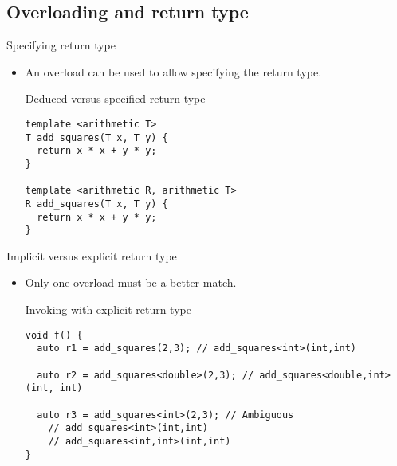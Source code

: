 \subsection{Overloading and return type}

\begin{frame}[t,fragile]{Specifying return type}
\begin{itemize}
  \item An overload can be used to allow specifying the return type.

\begin{block}{Deduced versus specified return type}
\begin{lstlisting}
template <arithmetic T>
T add_squares(T x, T y) {
  return x * x + y * y;
}

template <arithmetic R, arithmetic T>
R add_squares(T x, T y) {
  return x * x + y * y;
}
\end{lstlisting}
\end{block}

\end{itemize}
\end{frame}


\begin{frame}[t,fragile]{Implicit versus explicit return type}
\begin{itemize}

  \item Only one overload must be a better match.

\begin{block}{Invoking with explicit return type}
\begin{lstlisting}
void f() {
  auto r1 = add_squares(2,3); // add_squares<int>(int,int)

  auto r2 = add_squares<double>(2,3); // add_squares<double,int>(int, int)

  auto r3 = add_squares<int>(2,3); // Ambiguous
    // add_squares<int>(int,int)
    // add_squares<int,int>(int,int)
}
\end{lstlisting}
\end{block}

\end{itemize}
\end{frame}
